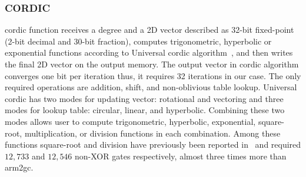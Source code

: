 \subsubsection{CORDIC}
\acrfull{cordic} function receives a degree and a 2D vector described as 32-bit fixed-point (2-bit decimal and 30-bit fraction), computes trigonometric, hyperbolic or exponential functions according to Universal \acrshort{cordic} algorithm~\cite{volder1959cordic}, and then writes the final 2D vector on the output memory.
The output vector in \acrshort{cordic} algorithm converges one bit per iteration thus, it requires 32 iterations in our case.
The only required operations are addition, shift, and non-oblivious table lookup.
Universal \acrshort{cordic} has two modes for updating vector: rotational and vectoring and three modes for lookup table: circular, linear, and hyperbolic.
Combining these two modes allows user to compute trigonometric, hyperbolic, exponential, square-root, multiplication, or division functions in each combination.
Among these functions square-root and division have previously been reported in~\cite{hussain2016privacy} and required $12,733$ and $12,546$ non-XOR gates respectively, almost three times more than \gls{arm2gc}.
